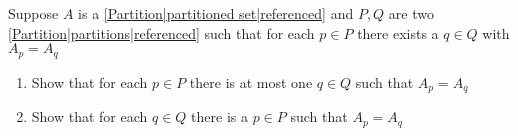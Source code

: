 
Suppose $A$ is a \ref{Partition|partitioned set|referenced} and $P,Q$ are two \ref{Partition|partitions|referenced} such that for each $p \in P$ there exists a $q \in Q$ with $A_p=A_q$
    \begin{enumerate}
      \item Show that for each $p \in P$ there is at most one $q \in Q$ such that $A_p = A_q$
      \item Show that for each $q \in Q$ there is a $p \in P$ such that $A_p = A_q$
    \end{enumerate}